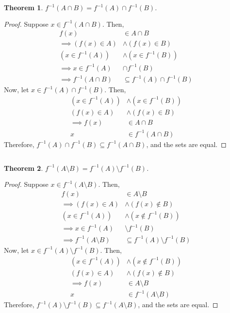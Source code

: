 \documentclass{article}
\newtheorem{theorem}{Theorem}
\begin{document}
\begin{theorem}
    \(f^{-1}(A \cap B) = f^{-1}(A) \cap f^{-1}(B)\).
\end{theorem}
\begin{proof}
    Suppose \(x \in f^{-1}(A \cap B)\).
    Then,
    \begin{align}
        f(x) &\in A \cap B \\
        \implies (f(x) \in A) &\land (f(x) \in B) \\
        (x \in f^{-1}(A)) &\land (x \in f^{-1}(B)) \\
        \implies x \in f^{-1}(A) &\cap f^{-1}(B) \\
        \implies f^{-1}(A \cap B) &\subseteq f^{-1}(A) \cap f^{-1}(B)
    \end{align}
    Now, let \(x \in f^{-1}(A) \cap f^{-1}(B)\).
    Then,
    \begin{align}
        (x \in f^{-1}(A)) &\land (x \in f^{-1}(B)) \\
        (f(x) \in A) &\land (f(x) \in B) \\
        \implies f(x) &\in A \cap B \\
        x &\in f^{-1}(A \cap B)
    \end{align}
    Therefore, \(f^{-1}(A) \cap f^{-1}(B) \subseteq f^{-1}(A \cap B)\), and the sets are equal.
\end{proof}

\subsection{}

\begin{theorem}
    \(f^{-1}(A \setminus B) = f^{-1}(A) \setminus f^{-1}(B)\).
\end{theorem}
\begin{proof}
    Suppose \(x \in f^{-1}(A \setminus B)\).
    Then,
    \begin{align}
        f(x) &\in A \setminus B \\
        \implies (f(x) \in A) &\land (f(x) \notin B) \\
        (x \in f^{-1}(A)) &\land (x \notin f^{-1}(B)) \\
        \implies x \in f^{-1}(A) &\setminus f^{-1}(B) \\
        \implies f^{-1}(A \setminus B) &\subseteq f^{-1}(A) \setminus f^{-1}(B)
    \end{align}
    Now, let \(x \in f^{-1}(A) \setminus f^{-1}(B)\).
    Then,
    \begin{align}
        (x \in f^{-1}(A)) &\land (x \notin f^{-1}(B)) \\
        (f(x) \in A) &\land (f(x) \notin B) \\
        \implies f(x) &\in A \setminus B \\
        x &\in f^{-1}(A \setminus B)
    \end{align}
    Therefore, \(f^{-1}(A) \setminus f^{-1}(B) \subseteq f^{-1}(A \setminus B)\), and the sets are equal.
\end{proof}
\end{document}
